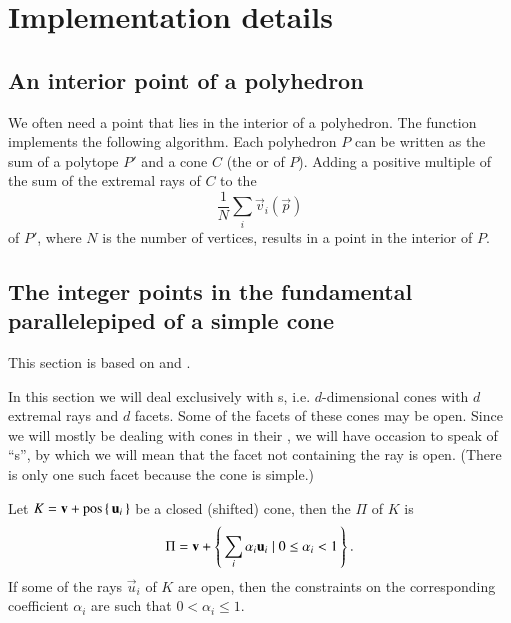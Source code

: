 \section{Implementation details}

\subsection{An interior point of a polyhedron}
\label{s:interior}

We often need a point that lies in the interior of a polyhedron.
The function  implements the following algorithm.
Each polyhedron $P$ can be written as the sum of a polytope $P'$ and a cone $C$
(the  or  of $P$).
Adding a positive multiple of the sum of the extremal rays of $C$ to
the 
$$
\frac 1 N \sum_i \vec v_i(\vec p)
$$
of $P'$, where $N$ is the number of vertices, results in a point
in the interior of $P$.

\subsection{The integer points in the fundamental parallelepiped of a simple cone}

\label{s:fundamental}

This section is based on  and
.

In this section we will deal exclusively with s,
i.e. $d$-dimensional cones with $d$ extremal rays and $d$ facets.
%
Some of the facets of these cones may be open.
Since we will mostly be dealing with cones in their
, we will have occasion to speak of
``s'', by which we will mean that the facet not
containing the ray is open.  (There is only one such facet because the cone
is simple.)

\begin{definition}
Let $K = \vec v + \poshull \lb\, \vec u_i \,\rb$ be 
a closed (shifted) cone, then the  $\Pi$
of $K$ is
$$
\Pi = \vec v +
\lb\, \sum_i \alpha_i \vec u_i \mid 0 \leq \alpha_i < 1 \,\rb
.
$$
If some of the rays $\vec u_i$ of $K$ are open, then the constraints on
the corresponding coefficient $\alpha_i$ are such that $0 < \alpha_i \le 1$.
\end{definition}

